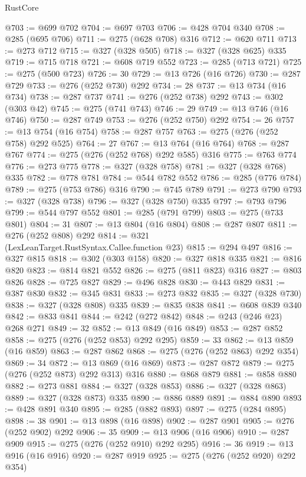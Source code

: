 \begin{lexlean}{RustCore}
\begin{coremodule}
@703 := @699 @702
@704 := @697 @703
@706 := @428 @704 @340
@708 := @285 (@695 @706)
@711 := @275 (@628 @708) @316
@712 := @620 @711
@713 := @273 @712
@715 := @327 (@328 @505)
@718 := @327 (@328 @625) @335
@719 := @715 @718
@721 := @608 @719 @552
@723 := @285 (@713 @721)
@725 := @275 (@500 @723)
@726 := 30
@729 := @13 @726 (@16 @726)
@730 := @287 @729
@733 := @276 (@252 @730) @292
@734 := 28
@737 := @13 @734 (@16 @734)
@738 := @287 @737
@741 := @276 (@252 @738) @292
@743 := @302 (@303 @42)
@745 := @275 (@741 @743)
@746 := 29
@749 := @13 @746 (@16 @746)
@750 := @287 @749
@753 := @276 (@252 @750) @292
@754 := 26
@757 := @13 @754 (@16 @754)
@758 := @287 @757
@763 := @275 (@276 (@252 @758) @292 @525)
@764 := 27
@767 := @13 @764 (@16 @764)
@768 := @287 @767
@774 := @275 (@276 (@252 @768) @292 @585) @316
@775 := @763 @774
@776 := @273 @775
@778 := @327 (@328 @758)
@781 := @327 (@328 @768) @335
@782 := @778 @781
@784 := @544 @782 @552
@786 := @285 (@776 @784)
@789 := @275 (@753 @786) @316
@790 := @745 @789
@791 := @273 @790
@793 := @327 (@328 @738)
@796 := @327 (@328 @750) @335
@797 := @793 @796
@799 := @544 @797 @552
@801 := @285 (@791 @799)
@803 := @275 (@733 @801)
@804 := 31
@807 := @13 @804 (@16 @804)
@808 := @287 @807
@811 := @276 (@252 @808) @292
@814 := @321 (LexLeanTarget.RustSyntax.Callee.function @23)
@815 := @294 @497
@816 := @327 @815
@818 := @302 (@303 @158)
@820 := @327 @818 @335
@821 := @816 @820
@823 := @814 @821 @552
@826 := @275 (@811 @823) @316
@827 := @803 @826
@828 := @725 @827
@829 := @496 @828
@830 := @443 @829
@831 := @387 @830
@832 := @345 @831
@833 := @273 @832
@835 := @327 (@328 @730)
@838 := @327 (@328 @808) @335
@839 := @835 @838
@841 := @608 @839 @340
@842 := @833 @841
@844 := @242 (@272 @842)
@848 := @243 (@246 @23) @268 @271
@849 := 32
@852 := @13 @849 (@16 @849)
@853 := @287 @852
@858 := @275 (@276 (@252 @853) @292 @295)
@859 := 33
@862 := @13 @859 (@16 @859)
@863 := @287 @862
@868 := @275 (@276 (@252 @863) @292 @354)
@869 := 34
@872 := @13 @869 (@16 @869)
@873 := @287 @872
@879 := @275 (@276 (@252 @873) @292 @313) @316
@880 := @868 @879
@881 := @858 @880
@882 := @273 @881
@884 := @327 (@328 @853)
@886 := @327 (@328 @863)
@889 := @327 (@328 @873) @335
@890 := @886 @889
@891 := @884 @890
@893 := @428 @891 @340
@895 := @285 (@882 @893)
@897 := @275 (@284 @895)
@898 := 38
@901 := @13 @898 (@16 @898)
@902 := @287 @901
@905 := @276 (@252 @902) @292
@906 := 35
@909 := @13 @906 (@16 @906)
@910 := @287 @909
@915 := @275 (@276 (@252 @910) @292 @295)
@916 := 36
@919 := @13 @916 (@16 @916)
@920 := @287 @919
@925 := @275 (@276 (@252 @920) @292 @354)

\end{coremodule}
\end{lexlean}
